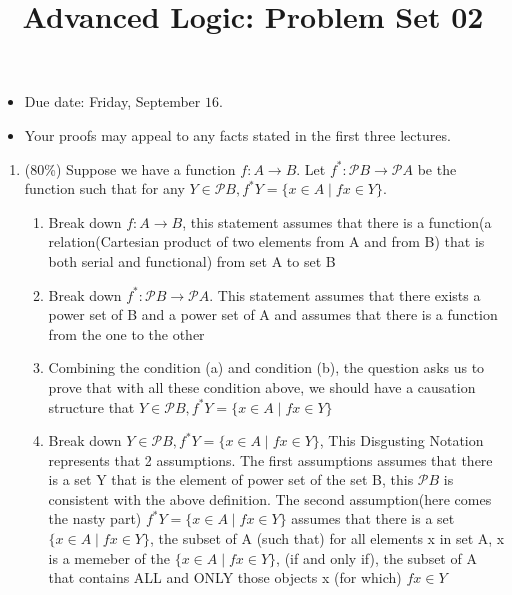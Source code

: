 \documentclass[10pt]{article}
\title{Advanced Logic: Problem Set 02 }
\author{}
\date{}
\begin{document}
\maketitle
\begin{itemize}
  \item Due date: Friday, September $16 .$

  \item Your proofs may appeal to any facts stated in the first three lectures.

\end{itemize}
\begin{enumerate}
  \item (80\%) Suppose we have a function $f: A \rightarrow B$. Let $f^{*}: \mathscr{P} B \rightarrow \mathscr{P} A$ be the function such that for any $Y \in \mathscr{P} B, f^{*} Y=\{x \in A \mid f x \in Y\}$.
  \begin{enumerate}
    \item Break down $f: A \rightarrow B$, this statement assumes that there is a function(a relation(Cartesian product of two elements from A and from B) that is both serial and functional) from set A to set B 
    \item Break down $f^{*}: \mathscr{P} B \rightarrow \mathscr{P} A$. This statement assumes that there exists a power set of B and a power set of A and assumes that there is a function from the one to the other
    \item Combining the condition (a) and condition (b), the question asks us to prove that with all these condition above, we should have a causation structure that $Y \in \mathscr{P} B, f^{*} Y=\{x \in A \mid f x \in Y\}$
    \item Break down $Y \in \mathscr{P} B, f^{*} Y=\{x \in A \mid f x \in Y\}$, 
    This Disgusting Notation represents that 2 assumptions. 
    The first assumptions assumes that there is a set Y that
    is the element of power set of the set B, this
    $\mathscr{P} B$ is consistent with the above 
    definition. The second assumption(here comes the nasty part) $ f^{*} Y=\{x \in A \mid f x \in Y\}$ assumes that there is a set $\{x \in A \mid f x \in Y\}$, the subset of A (such that) for all elements x in set A,
    x is a memeber of the $\{x \in A \mid f x \in Y\}$,
    (if and only if), the subset of A that contains ALL and ONLY those objects x (for which) $f x \in Y$



\end{enumerate}
\end{enumerate}
\end{document}
